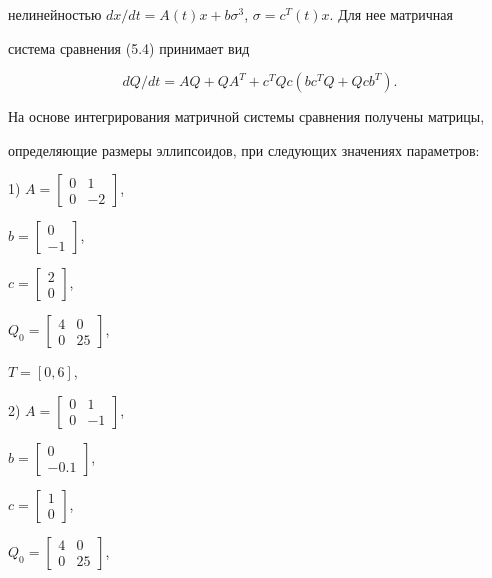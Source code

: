 нелинейностью $dx/dt=A(t)x+b\sigma^3$, $\sigma=c^T(t)x$. Для нее матричная 


система сравнения (5.4) принимает вид 


$$ 


d Q/d t=A Q+Q A^T+c^T Q c(b c^T Q+Q c b^T). 


$$ 


На основе интегрирования матричной системы сравнения получены матрицы, 


определяющие размеры эллипсоидов, при следующих значениях параметров: 


 


1) $A=\left[\begin{smallmatrix}0 & 1 \\ 0 & -2 \end{smallmatrix}\right]$, 


$b=\left[\begin{smallmatrix}0 \\ -1\end{smallmatrix}\right]$, 


$c=\left[\begin{smallmatrix} 2 \\ 0\end{smallmatrix}\right]$, 


$Q_0=\left[\begin{smallmatrix}4 & 0 \\ 0 & 25\end{smallmatrix}\right]$, 


$T=[0,6]$, 


 


2) $A=\left[\begin{smallmatrix}0 & 1 \\ 0 & -1\end{smallmatrix}\right]$, 


$b=\left[\begin{smallmatrix}0 \\-0.1\end{smallmatrix}\right]$, 


$c=\left[\begin{smallmatrix}1 \\ 0\end{smallmatrix}\right]$, 


$Q_0=\left[\begin{smallmatrix}4 & 0 \\ 0 & 25\end{smallmatrix}\right]$, 


